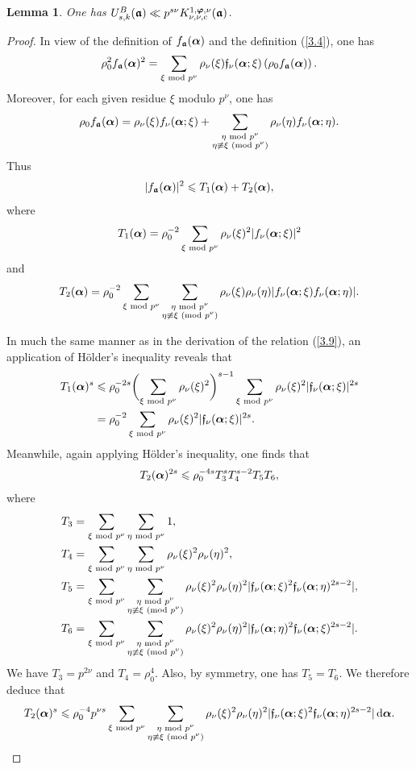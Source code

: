 \documentclass[12pt,reqno]{amsart}
\newtheorem{lemma}[theorem]{Lemma}
\theoremstyle{definition}
\theoremstyle{remark}
\numberwithin{equation}{section}
\newcommand{\mmod}[1]{\,\,(\text{\rm mod}\,\,#1)}
\newcommand{\nmod}[1]{\,\,\text{\rm mod}\,\,#1}
\def\grf{{\mathfrak f}}\def\grF{{\mathfrak F}}
\def\le{\leqslant} \def\ge{\geqslant} \def\pleq{\preccurlyeq} \def\ple{\prec}
\def\d{{\,{\rm d}}}
\begin{document}
\begin{lemma}\label{lemma6.1} One has $U_{s,k}^B({\boldsymbol {{\mathfrak a}}})\ll p^{s\nu}
K_{\nu,\nu,c}^{1,{\boldsymbol \varphi},\nu}({\boldsymbol {{\mathfrak a}}})$.
\end{lemma}

\begin{proof} In view of the definition of $f_{\boldsymbol {{\mathfrak a}}}({\boldsymbol \alpha})$ and the definition (\ref{3.4}), 
one has
$$\rho_0^2f_\bfgra(\bfalp)^2=\sum_{\xi\nmod{p^\nu}}\rho_\nu(\xi)\grf_\nu(\bfalp;\xi)
\left( \rho_0f_\bfgra(\bfalp)\right) .$$
Moreover, for each given residue $\xi$ modulo $p^\nu$, one has
$$\rho_0f_\bfgra(\bfalp)=\rho_\nu(\xi)f_\nu(\bfalp;\xi)+
\sum_{\substack{\eta\nmod{p^\nu}\\ \eta\not \equiv \xi\mmod{p^\nu}}}\rho_\nu(\eta)
f_\nu(\bfalp;\eta).$$
Thus
\begin{equation}\label{6.6}
|f_\bfgra(\bfalp)|^2\le T_1(\bfalp)+T_2(\bfalp),
\end{equation}
where
$$T_1(\bfalp)=\rho_0^{-2}\sum_{\xi\nmod{p^\nu}}\rho_\nu(\xi)^2|f_\nu(\bfalp;\xi)|^2$$
and
$$T_2(\bfalp)=\rho_0^{-2}\sum_{\xi\nmod{p^\nu}}\sum_{\substack{\eta\nmod{p^\nu}\\
\eta\not\equiv \xi\mmod{p^\nu}}}\rho_\nu(\xi)\rho_\nu(\eta)|f_\nu(\bfalp;\xi)
f_\nu(\bfalp;\eta)|.$$

\par In much the same manner as in the derivation of the relation (\ref{3.9}), an application 
of H\"older's inequality reveals that
\begin{align}
T_1(\bfalp)^s&\le \rho_0^{-2s}\biggl( \sum_{\xi\nmod{p^\nu}}\rho_\nu(\xi)^2
\biggr)^{s-1}\sum_{\xi\nmod{p^\nu}}\rho_\nu(\xi)^2|\grf_\nu(\bfalp;\xi)|^{2s}\notag \\
&=\rho_0^{-2}\sum_{\xi\nmod{p^\nu}}\rho_\nu(\xi)^2|\grf_\nu(\bfalp;\xi)|^{2s}.
\label{6.7}
\end{align}
Meanwhile, again applying H\"older's inequality, one finds that
$$T_2(\bfalp)^{2s}\le \rho_0^{-4s}T_3^sT_4^{s-2}T_5T_6,$$
where
\begin{align*}
T_3&=\sum_{\xi\nmod{p^\nu}}\sum_{\eta\nmod{p^\nu}}1,\\
T_4&=\sum_{\xi\nmod{p^\nu}}\sum_{\eta\nmod{p^\nu}}\rho_\nu(\xi)^2\rho_\nu(\eta)^2,
\\
T_5&=\sum_{\xi\nmod{p^\nu}}
\sum_{\substack{\eta\nmod{p^\nu}\\ \eta\not\equiv \xi\mmod{p^\nu}}}\rho_\nu(\xi)^2
\rho_\nu(\eta)^2|\grf_\nu(\bfalp;\xi)^2\grf_\nu(\bfalp;\eta)^{2s-2}|,\\
T_6&=\sum_{\xi\nmod{p^\nu}}
\sum_{\substack{\eta\nmod{p^\nu}\\ \eta\not \equiv \xi\mmod{p^\nu}}}\rho_\nu(\xi)^2
\rho_\nu(\eta)^2|\grf_\nu(\bfalp;\eta)^2\grf_\nu(\bfalp;\xi)^{2s-2}|.
\end{align*}
We have $T_3=p^{2\nu}$ and $T_4=\rho_0^4$. Also, by symmetry, one has 
$T_5=T_6$. We therefore deduce that
\begin{equation}\label{6.8}
T_2(\bfalp)^s\le \rho_0^{-4}p^{\nu s}\sum_{\xi \nmod{p^\nu}}
\sum_{\substack{\eta\nmod{p^\nu}\\ \eta\not \equiv \xi\mmod{p^\nu}}}\rho_\nu(\xi)^2
\rho_\nu(\eta)^2|\grf_\nu (\bfalp;\xi)^2\grf_\nu(\bfalp;\eta)^{2s-2}|\d\bfalp .
\end{equation}


\end{proof}
\end{document}
